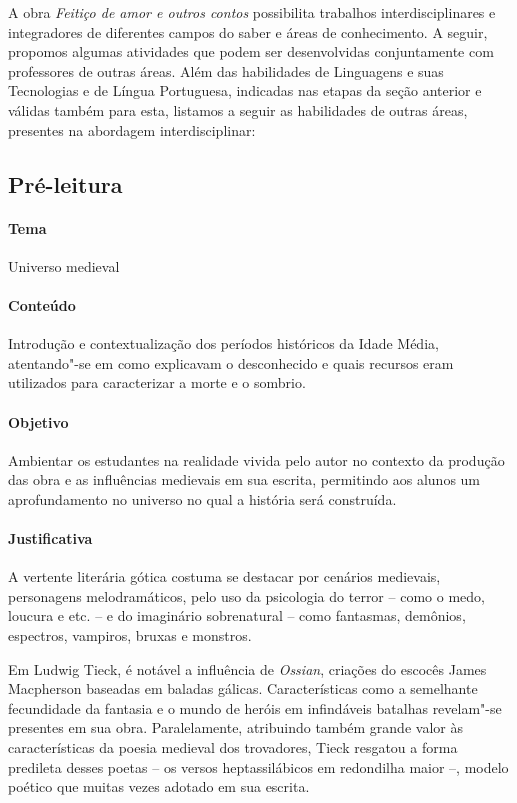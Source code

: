 \documentclass[12pt]{extarticle}
\begin{document}
A obra \emph{Feitiço de amor e outros contos} possibilita trabalhos
interdisciplinares e integradores de diferentes campos do saber e áreas
de conhecimento. A seguir, propomos algumas atividades que podem ser
desenvolvidas conjuntamente com professores de outras áreas. Além das
habilidades de Linguagens e suas Tecnologias e de Língua Portuguesa,
indicadas nas etapas da seção anterior e válidas também para esta,
listamos a seguir as habilidades de outras áreas, presentes na abordagem
interdisciplinar:

\subsection{Pré-leitura}

\paragraph{Tema} Universo medieval 

\paragraph{Conteúdo} Introdução e contextualização dos períodos históricos
da Idade Média, atentando"-se em como explicavam o desconhecido e quais recursos 
eram utilizados para caracterizar a morte e o sombrio. 

\paragraph{Objetivo} Ambientar os estudantes na realidade vivida pelo autor no contexto 
da produção das obra e as influências medievais em sua escrita, permitindo aos alunos um 
aprofundamento no universo no qual a história será construída.

\paragraph{Justificativa} A vertente literária gótica costuma se destacar por cenários medievais,
personagens melodramáticos, pelo uso da psicologia do terror -- como o medo,
loucura e etc. -- e do imaginário sobrenatural -- como fantasmas,
demônios, espectros, vampiros, bruxas e monstros.

Em Ludwig Tieck, é notável a influência de \textit{Ossian}, criações do escocês James Macpherson 
baseadas em baladas gálicas. Características como a semelhante fecundidade da fantasia e o mundo 
de heróis em infindáveis batalhas revelam"-se presentes em sua obra. Paralelamente, atribuindo 
também grande valor às características da poesia medieval dos trovadores,
Tieck resgatou a forma predileta desses poetas -- os
versos heptassilábicos em redondilha maior --, modelo poético
que muitas vezes adotado em sua escrita.
\end{document}
